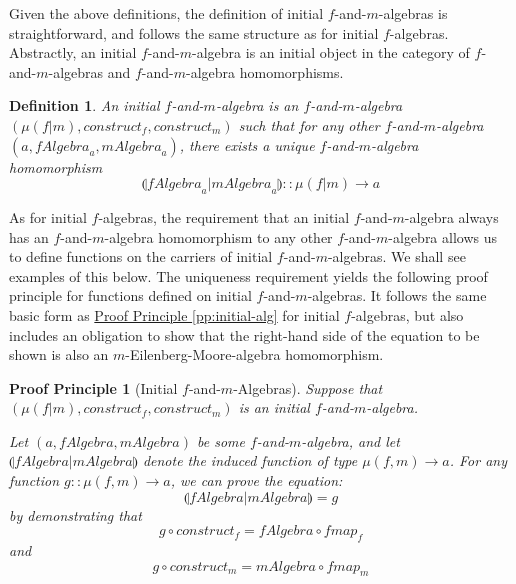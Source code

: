 \documentclass{jfp1}
\newcommand{\eFold}[2]{\llparenthesis #1|#2 \rrparenthesis}
\newtheorem{definition}{Definition}
\newtheorem{proofprinciple}{Proof Principle}
\newcommand{\proofprinref}[1]{\hyperref[#1]{Proof Principle \ref*{#1}}}
\begin{document}
Given the above definitions, the definition of initial
$f$-and-$m$-algebras is straightforward, and follows the same
structure as for initial $f$-algebras. Abstractly, an initial
$f$-and-$m$-algebra is an initial object in the category of
$f$-and-$m$-algebras and $f$-and-$m$-algebra homomorphisms.

\begin{definition}
  An \emph{initial} $f$-and-$m$-algebra is an $f$-and-$m$-algebra
  $(\mu(f|m), \mathit{construct}_f, \mathit{construct}_m)$ such that
  for any other $f$-and-$m$-algebra $(a, \mathit{fAlgebra}_a,
  \mathit{mAlgebra}_a)$, there exists a \emph{unique}
  $f$-and-$m$-algebra homomorphism
  \begin{displaymath}
    \eFold{\mathit{fAlgebra}_a}{\mathit{mAlgebra}_a} :: \mu(f|m) \to a
  \end{displaymath}
\end{definition}

As for initial $f$-algebras, the requirement that an initial
$f$-and-$m$-algebra always has an $f$-and-$m$-algebra homomorphism to
any other $f$-and-$m$-algebra allows us to define functions on the
carriers of initial $f$-and-$m$-algebras. We shall see examples of
this below. The uniqueness requirement yields the following proof
principle for functions defined on initial $f$-and-$m$-algebras. It
follows the same basic form as \proofprinref{pp:initial-alg} for
initial $f$-algebras, but also includes an obligation to show that the
right-hand side of the equation to be shown is also an
$m$-Eilenberg-Moore-algebra homomorphism.

\begin{proofprinciple}[Initial $f$-and-$m$-Algebras]
  \label{pp:initial-f-m-alg}
  Suppose that $(\mu(f|m), \mathit{construct}_f,
  \mathit{construct}_m)$ is an initial $f$-and-$m$-algebra.

  Let $(a, \mathit{fAlgebra}, \mathit{mAlgebra})$ be some
  $f$-and-$m$-algebra, and let
  $\eFold{\mathit{fAlgebra}}{\mathit{mAlgebra}}$ denote the induced
  function of type $\mu(f,m) \to a$. For any function $g :: \mu(f,m)
  \to a$, we can prove the equation:
  \begin{displaymath}
    \eFold{\mathit{fAlgebra}}{\mathit{mAlgebra}} = g
  \end{displaymath}
  by demonstrating that
  \begin{displaymath}
    g \circ \mathit{construct}_f = \mathit{fAlgebra} \circ \mathit{fmap}_f
  \end{displaymath}
  and
  \begin{displaymath}
    g \circ \mathit{construct}_m = \mathit{mAlgebra} \circ \mathit{fmap}_m
  \end{displaymath}
\end{proofprinciple}
\end{document}
